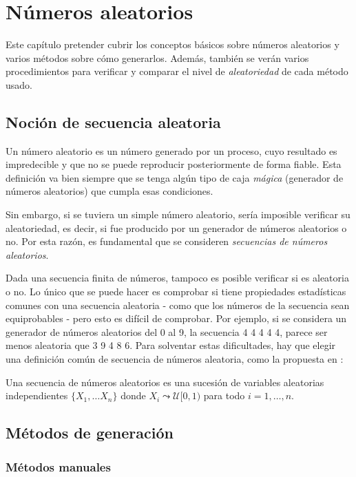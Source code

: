 \chapter{Números aleatorios}

Este capítulo pretender cubrir los conceptos básicos sobre números aleatorios y varios métodos sobre cómo generarlos.  Además, también se verán varios procedimientos para verificar y comparar el nivel de \textit{aleatoriedad} de cada método usado.

\section{Noción de secuencia aleatoria}

Un número aleatorio es un número generado por un proceso, cuyo resultado es impredecible y que no se puede reproducir posteriormente de forma fiable. Esta definición va bien siempre que se tenga algún tipo de caja \textit{mágica} (generador de números aleatorios) que cumpla esas condiciones.

Sin embargo, si se tuviera un simple número aleatorio, sería imposible verificar su aleatoriedad, es decir, si fue producido por un generador de números aleatorios o no. Por esta razón, es fundamental que se consideren \textit{secuencias de números aleatorios}.

Dada una secuencia finita de números, tampoco es posible verificar si es aleatoria o no. Lo único que se puede hacer es comprobar si tiene propiedades estadísticas comunes con una secuencia aleatoria - como que los números de la secuencia sean equiprobables - pero esto es difícil de comprobar. Por ejemplo, si se considera un generador de números aleatorios del 0 al 9, la secuencia 4 4 4 4 4, parece ser menos aleatoria que 3 9 4 8 6. Para solventar estas dificultades, hay que elegir una definición común de secuencia de números aleatoria, como la propuesta en \cite{SalmeronMorales}:

\begin{definition}
Una secuencia de números aleatorios es una sucesión de variables aleatorias independientes $\{X_1,\ldots X_n\}$ donde $X_i\leadsto\mathcal{U}[0,1)$ para todo $i=1,\ldots,n$.
\end{definition}

\section{Métodos de generación}

\subsection{Métodos manuales}

